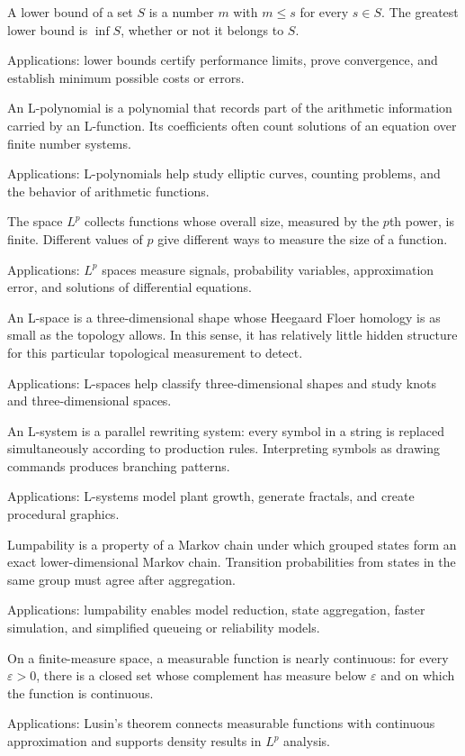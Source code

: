 A lower bound of a set $S$ is a number $m$ with $m\leq s$ for every $s\in S$. The greatest lower bound is $\inf S$, whether or not it belongs to $S$. \par\noindent Applications: lower bounds certify performance limits, prove convergence, and establish minimum possible costs or errors.

An L-polynomial is a polynomial that records part of the arithmetic information carried by an L-function. Its coefficients often count solutions of an equation over finite number systems. \par\noindent Applications: L-polynomials help study elliptic curves, counting problems, and the behavior of arithmetic functions.

The space $L^p$ collects functions whose overall size, measured by the $p$th power, is finite. Different values of $p$ give different ways to measure the size of a function. \par\noindent Applications: $L^p$ spaces measure signals, probability variables, approximation error, and solutions of differential equations.

An L-space is a three-dimensional shape whose Heegaard Floer homology is as small as the topology allows. In this sense, it has relatively little hidden structure for this particular topological measurement to detect. \par\noindent Applications: L-spaces help classify three-dimensional shapes and study knots and three-dimensional spaces.

An L-system is a parallel rewriting system: every symbol in a string is replaced simultaneously according to production rules. Interpreting symbols as drawing commands produces branching patterns. \par\noindent Applications: L-systems model plant growth, generate fractals, and create procedural graphics.

Lumpability is a property of a Markov chain under which grouped states form an exact lower-dimensional Markov chain. Transition probabilities from states in the same group must agree after aggregation. \par\noindent Applications: lumpability enables model reduction, state aggregation, faster simulation, and simplified queueing or reliability models.

On a finite-measure space, a measurable function is nearly continuous: for every $\varepsilon>0$, there is a closed set whose complement has measure below $\varepsilon$ and on which the function is continuous. \par\noindent Applications: Lusin's theorem connects measurable functions with continuous approximation and supports density results in $L^p$ analysis.
